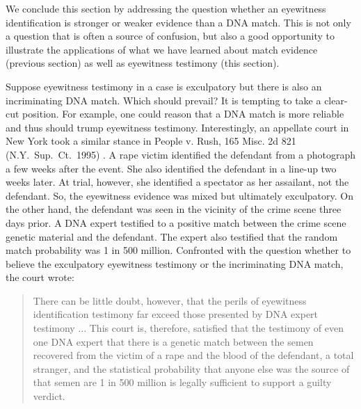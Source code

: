 \documentclass[
  10pt,
  dvipsnames,enabledeprecatedfontcommands]{scrartcl}
\begin{document}
We conclude this section by addressing the question whether an
eyewitness identification is stronger or weaker evidence than a DNA
match. This is not only a question that is often a source of confusion,
but also a good opportunity to illustrate the applications of what we
have learned about match evidence (previous section) as well as
eyewitness testimony (this section).

Suppose eyewitness testimony in a case is exculpatory but there is also
an incriminating DNA match. Which should prevail? It is tempting to take
a clear-cut position. For example, one could reason that a DNA match is
more reliable and thus should trump eyewitness testimony. Interestingly,
an appellate court in New York took a similar stance in People v. Rush,
165 Misc. 2d 821 (N.Y.~Sup.~Ct.~1995) . A rape victim identified the
defendant from a photograph a few weeks after the event. She also
identified the defendant in a line-up two weeks later. At trial,
however, she identified a spectator as her assailant, not the defendant.
So, the eyewitness evidence was mixed but ultimately exculpatory. On the
other hand, the defendant was seen in the vicinity of the crime scene
three days prior. A DNA expert testified to a positive match between the
crime scene genetic material and the defendant. The expert also
testified that the random match probability was 1 in 500 million.
Confronted with the question whether to believe the exculpatory
eyewitness testimony or the incriminating DNA match, the court wrote:

\begin{quote}
There can be little doubt, however, that the perils of eyewitness identification testimony far exceed those presented by DNA expert testimony ... This court is, therefore, satisfied that the testimony of even one DNA expert that there is a genetic match between the semen recovered from the victim of a rape and the blood of the defendant, a total stranger, and the statistical probability that anyone else was the source of that semen are 1 in 500 million is legally sufficient to support a guilty verdict.
\end{quote}

\noindent
\end{document}
